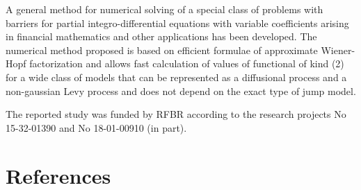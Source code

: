\documentclass[a4paper]{jpconf}
\begin{document}
A general method for numerical solving of a special class of problems with barriers for partial integro-differential equations with variable coefficients  arising in financial mathematics and other applications has been developed. The numerical method proposed is based on efficient  formulae of approximate Wiener-Hopf factorization and allows fast calculation of values of functional of kind (2) for a wide class of models that can be represented as a diffusional process and a non-gaussian Levy process and does not depend on the exact type of jump model. 

The reported study was funded by RFBR according to the research projects No 15-32-01390 and No 18-01-00910 (in part).


\section*{References}
\medskip
\end{document}
